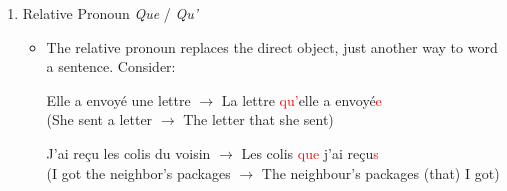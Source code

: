 \documentclass{book}
\begin{document}
\begin{enumerate}
    \item Relative Pronoun \textit{Que} / \textit{Qu'}
    \begin{itemize}
        \item The relative pronoun replaces the direct object, just another way to word a sentence. Consider:
        \begin{center}
            Elle a envoyé une lettre $\to$ La lettre \textcolor{red}{qu'}elle a envoyé\textcolor{red}{e} \\
            (She sent a letter $\to$ The letter that she sent)
        \end{center}

        \begin{center}
            J'ai reçu les colis du voisin $\to$ Les colis \textcolor{red}{que} j'ai reçu\textcolor{red}{s} \\
            (I got the neighbor's packages $\to$ The neighbour's packages (that) I got)
        \end{center}
    \end{itemize}
    
    
    
\end{enumerate}
\end{document}
